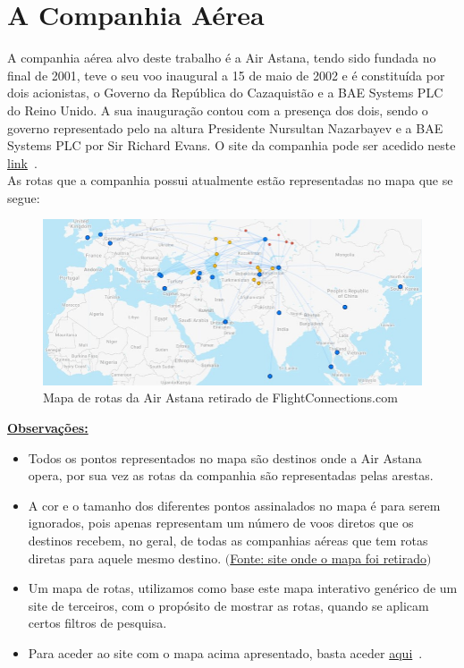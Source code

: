\chapter{A Companhia Aérea}
\label{chapter:Companhia Aérea}
A companhia aérea alvo deste trabalho é a Air Astana, tendo sido fundada no final de 2001, teve o seu voo inaugural a 15 de maio de 2002 e é constituída por dois acionistas, o Governo da República do Cazaquistão e a BAE Systems PLC do Reino Unido.
A sua inauguração contou com a presença dos dois, sendo o governo representado pelo na altura Presidente Nursultan Nazarbayev e a BAE Systems PLC por Sir Richard Evans.
O site da companhia pode ser acedido neste \href{https://airastana.com/global/en-us}{link}~\cite{link1}.\\
\indent As rotas que a companhia possui atualmente estão representadas no mapa que se segue:

\begin{figure}[h]
        \centering
        \includegraphics[width=1\textwidth]{imgs/Figura1}
        \caption{Mapa de rotas da Air Astana retirado de FlightConnections.com\label{fig:imagem1}}
\end{figure}

\noindent\underline{\textbf{Observações:}}\\
\begin{itemize}
\item Todos os pontos representados no mapa são destinos onde a Air Astana opera, por sua vez as rotas da
companhia são representadas pelas arestas.
\item A cor e o tamanho dos diferentes pontos assinalados no mapa é para serem ignorados, pois apenas
representam um número de voos diretos que os destinos recebem, no geral, de todas as companhias aéreas 
que tem rotas diretas para aquele mesmo destino. \href{https://www.flightconnections.com}{$($Fonte: site onde o mapa foi retirado$)$}~\cite{link2}

\item Um mapa de rotas, utilizamos como base este mapa interativo genérico de um site de terceiros, com o
propósito de mostrar as rotas, quando se aplicam certos filtros de pesquisa.
\item Para aceder ao site com o mapa acima apresentado, basta aceder \href{https://www.flightconnections.com/route-map-air-astana-kc}{aqui}~\cite{link3}.
\end{itemize}
\clearpage
